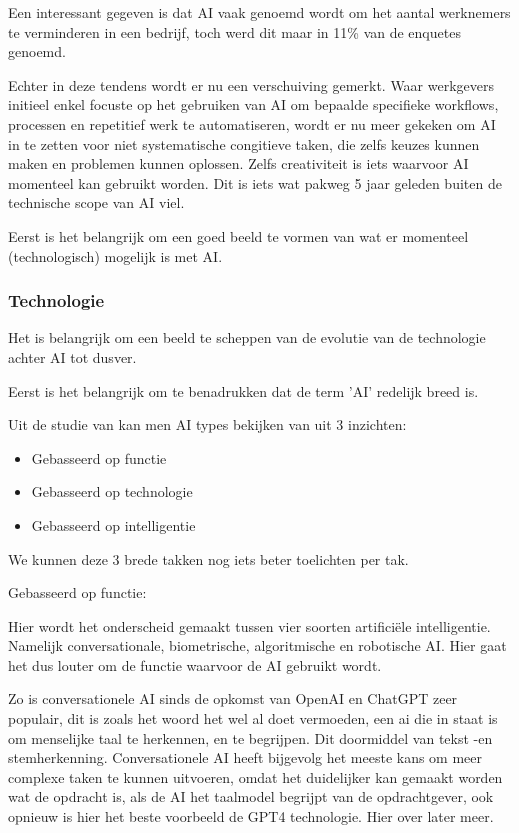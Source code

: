 Een interessant gegeven is dat AI vaak genoemd wordt om het aantal werknemers te verminderen in een bedrijf, toch werd dit maar in 11\% van de enquetes genoemd. 

Echter in deze tendens wordt er nu een verschuiving gemerkt. Waar werkgevers initieel enkel focuste op het gebruiken van AI om bepaalde specifieke workflows, processen en repetitief werk te automatiseren, wordt er nu meer gekeken om AI in te zetten voor niet systematische congitieve taken, die zelfs keuzes kunnen maken en problemen kunnen oplossen. Zelfs creativiteit is iets waarvoor AI momenteel kan gebruikt worden. Dit is iets wat pakweg 5 jaar geleden buiten de technische scope van AI viel. 

Eerst is het belangrijk om een goed beeld te vormen van wat er momenteel (technologisch) mogelijk is met AI.

\subsubsection{Technologie}
Het is belangrijk om een beeld te scheppen van de evolutie van de technologie achter AI tot dusver.

Eerst is het belangrijk om te benadrukken dat de term 'AI' redelijk breed is.

Uit de studie van \cite{benbya2020artificial} kan men AI types bekijken van uit 3 inzichten:
\begin{itemize}
    \item Gebasseerd op functie
    \item Gebasseerd op technologie
    \item Gebasseerd op intelligentie
\end{itemize}

We kunnen deze 3 brede takken nog iets beter toelichten per tak.

Gebasseerd op functie: 

    Hier wordt het onderscheid gemaakt tussen vier soorten artificiële intelligentie. Namelijk conversationale, biometrische, algoritmische en robotische AI. Hier gaat het dus louter om de functie waarvoor de AI gebruikt wordt. 
    
    Zo is conversationele AI sinds de opkomst van OpenAI en ChatGPT zeer populair, dit is zoals het woord het wel al doet vermoeden, een ai die in staat is om menselijke taal te herkennen, en te begrijpen. Dit doormiddel van tekst -en stemherkenning. Conversationele AI heeft bijgevolg het meeste kans om meer complexe taken te kunnen uitvoeren, omdat het duidelijker kan gemaakt worden wat de opdracht is, als de AI het taalmodel begrijpt van de opdrachtgever, ook opnieuw is hier het beste voorbeeld de GPT4 technologie. Hier over later meer. 
    
